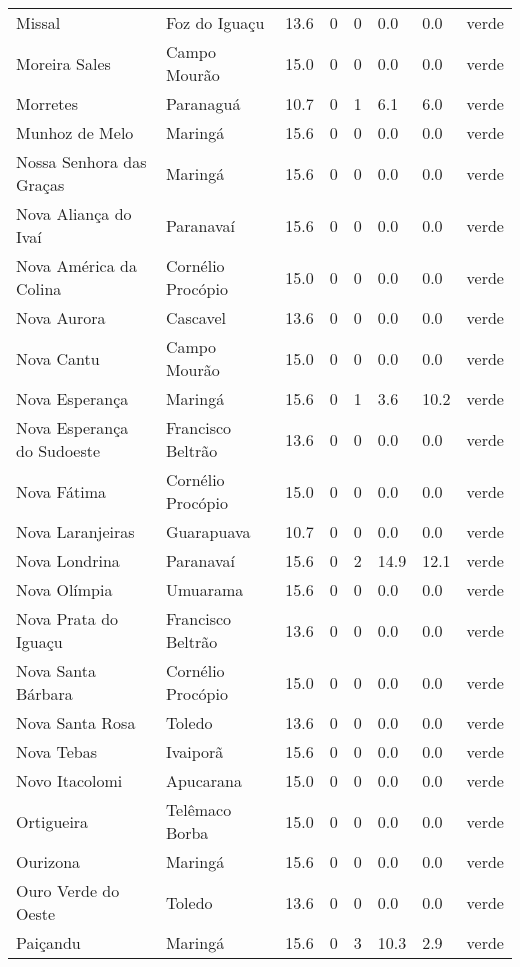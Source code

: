 \begin{longtable}{l|lllllll}
  Missal & Foz do Iguaçu & 13.6 & 0 & 0 & 0.0 & 0.0 & verde \\ 
  Moreira Sales & Campo Mourão & 15.0 & 0 & 0 & 0.0 & 0.0 & verde \\ 
  Morretes & Paranaguá & 10.7 & 0 & 1 & 6.1 & 6.0 & verde \\ 
  Munhoz de Melo & Maringá & 15.6 & 0 & 0 & 0.0 & 0.0 & verde \\ 
  Nossa Senhora das Graças & Maringá & 15.6 & 0 & 0 & 0.0 & 0.0 & verde \\ 
  Nova Aliança do Ivaí & Paranavaí & 15.6 & 0 & 0 & 0.0 & 0.0 & verde \\ 
  Nova América da Colina & Cornélio Procópio & 15.0 & 0 & 0 & 0.0 & 0.0 & verde \\ 
  Nova Aurora & Cascavel & 13.6 & 0 & 0 & 0.0 & 0.0 & verde \\ 
  Nova Cantu & Campo Mourão & 15.0 & 0 & 0 & 0.0 & 0.0 & verde \\ 
  Nova Esperança & Maringá & 15.6 & 0 & 1 & 3.6 & 10.2 & verde \\ 
  Nova Esperança do Sudoeste & Francisco Beltrão & 13.6 & 0 & 0 & 0.0 & 0.0 & verde \\ 
  Nova Fátima & Cornélio Procópio & 15.0 & 0 & 0 & 0.0 & 0.0 & verde \\ 
  Nova Laranjeiras & Guarapuava & 10.7 & 0 & 0 & 0.0 & 0.0 & verde \\ 
  Nova Londrina & Paranavaí & 15.6 & 0 & 2 & 14.9 & 12.1 & verde \\ 
  Nova Olímpia & Umuarama & 15.6 & 0 & 0 & 0.0 & 0.0 & verde \\ 
  Nova Prata do Iguaçu & Francisco Beltrão & 13.6 & 0 & 0 & 0.0 & 0.0 & verde \\ 
  Nova Santa Bárbara & Cornélio Procópio & 15.0 & 0 & 0 & 0.0 & 0.0 & verde \\ 
  Nova Santa Rosa & Toledo & 13.6 & 0 & 0 & 0.0 & 0.0 & verde \\ 
  Nova Tebas & Ivaiporã & 15.6 & 0 & 0 & 0.0 & 0.0 & verde \\ 
  Novo Itacolomi & Apucarana & 15.0 & 0 & 0 & 0.0 & 0.0 & verde \\ 
  Ortigueira & Telêmaco Borba & 15.0 & 0 & 0 & 0.0 & 0.0 & verde \\ 
  Ourizona & Maringá & 15.6 & 0 & 0 & 0.0 & 0.0 & verde \\ 
  Ouro Verde do Oeste & Toledo & 13.6 & 0 & 0 & 0.0 & 0.0 & verde \\ 
  Paiçandu & Maringá & 15.6 & 0 & 3 & 10.3 & 2.9 & verde \\ 

\end{longtable}
